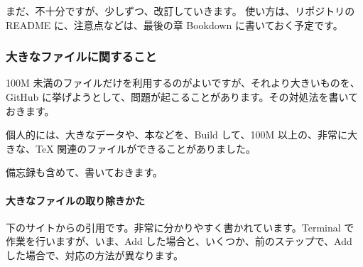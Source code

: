 \documentclass[
]{bxjsbook}
\theoremstyle{definition}
\theoremstyle{definition}
\theoremstyle{definition}
\theoremstyle{definition}
\theoremstyle{remark}
\begin{document}
まだ、不十分ですが、少しずつ、改訂していきます。
使い方は、リポジトリの README に、注意点などは、最後の章 Bookdown に書いておく予定です。

\hypertarget{ux5927ux304dux306aux30d5ux30a1ux30a4ux30ebux306bux95a2ux3059ux308bux3053ux3068}{%
\subsubsection{大きなファイルに関すること}\label{ux5927ux304dux306aux30d5ux30a1ux30a4ux30ebux306bux95a2ux3059ux308bux3053ux3068}}

100M 未満のファイルだけを利用するのがよいですが、それより大きいものを、GitHub に挙げようとして、問題が起こることがあります。その対処法を書いておきます。

個人的には、大きなデータや、本などを、Build して、100M 以上の、非常に大きな、TeX 関連のファイルができることがありました。

備忘録も含めて、書いておきます。

\hypertarget{ux5927ux304dux306aux30d5ux30a1ux30a4ux30ebux306eux53d6ux308aux9664ux304dux304bux305f}{%
\paragraph{大きなファイルの取り除きかた}\label{ux5927ux304dux306aux30d5ux30a1ux30a4ux30ebux306eux53d6ux308aux9664ux304dux304bux305f}}

下のサイトからの引用です。非常に分かりやすく書かれています。Terminal で作業を行いますが、いま、Add した場合と、いくつか、前のステップで、Add した場合で、対応の方法が異なります。
\end{document}
